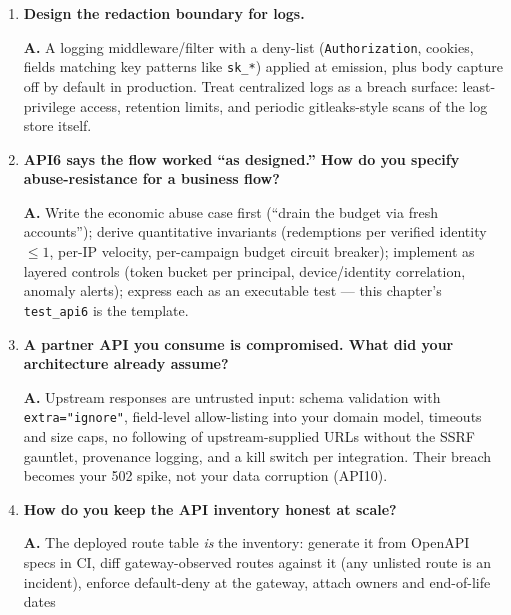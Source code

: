 \begin{enumerate}[label=\textbf{Q\arabic*.}, leftmargin=1.7cm, itemsep=0.9em, start=23]
{        production?}\par
        \textbf{A.} Per-principal object-access metrics: distinct owners
        touched per subject, sequential-id walk detection, 403:200 ratio
        shifts, enumeration velocity. Alert on \emph{successful}
        cross-owner reads, not just denied ones --- denials are the
        rehearsal; successes are the breach.
  \item \textbf{Design the redaction boundary for logs.}\par
        \textbf{A.} A logging middleware/filter with a deny-list
        (\texttt{Authorization}, cookies, fields matching key patterns
        like \texttt{sk\_*}) applied at emission, plus body capture off by
        default in production. Treat centralized logs as a breach surface:
        least-privilege access, retention limits, and periodic
        gitleaks-style scans of the log store itself.
  \item \textbf{API6 says the flow worked ``as designed.'' How do you
        specify abuse-resistance for a business flow?}\par
        \textbf{A.} Write the economic abuse case first (``drain the
        budget via fresh accounts''); derive quantitative invariants
        (redemptions per verified identity $\le 1$, per-IP velocity,
        per-campaign budget circuit breaker); implement as layered
        controls (token bucket per principal, device/identity
        correlation, anomaly alerts); express each as an executable test
        --- this chapter's \texttt{test\_api6} is the template.
  \item \textbf{A partner API you consume is compromised. What did your
        architecture already assume?}\par
        \textbf{A.} Upstream responses are untrusted input: schema
        validation with \texttt{extra="ignore"}, field-level allow-listing
        into your domain model, timeouts and size caps, no following of
        upstream-supplied URLs without the SSRF gauntlet, provenance
        logging, and a kill switch per integration. Their breach becomes
        your 502 spike, not your data corruption (API10).
  \item \textbf{How do you keep the API inventory honest at scale?}\par
        \textbf{A.} The deployed route table \emph{is} the inventory:
        generate it from OpenAPI specs in CI, diff gateway-observed routes
        against it (any unlisted route is an incident), enforce
        default-deny at the gateway, attach owners and end-of-life dates

\end{enumerate}
